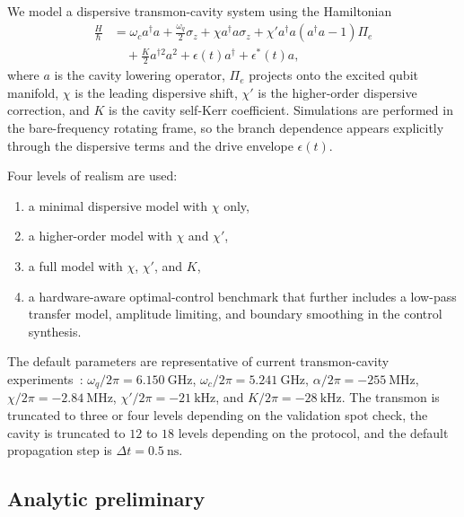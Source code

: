 \documentclass[aps,pra,twocolumn,reprint,floatfix,amsmath,amssymb]{revtex4-2}
\begin{document}
We model a dispersive transmon-cavity system using the Hamiltonian
\begin{align}
\frac{H}{\hbar} &=
\omega_c a^\dagger a + \frac{\omega_q}{2}\sigma_z
+ \chi a^\dagger a \sigma_z
+ \chi' a^\dagger a (a^\dagger a - 1) \Pi_e
\nonumber\\
&\quad
+ \frac{K}{2} a^{\dagger 2} a^2
+ \epsilon(t) a^\dagger + \epsilon^*(t) a,
\label{eq:fullham}
\end{align}
where \(a\) is the cavity lowering operator, \(\Pi_e\) projects onto the excited qubit manifold, \(\chi\) is the leading dispersive shift, \(\chi'\) is the higher-order dispersive correction, and \(K\) is the cavity self-Kerr coefficient. Simulations are performed in the bare-frequency rotating frame, so the branch dependence appears explicitly through the dispersive terms and the drive envelope \(\epsilon(t)\).

Four levels of realism are used:
\begin{enumerate}
  \item a minimal dispersive model with \(\chi\) only,
  \item a higher-order model with \(\chi\) and \(\chi'\),
  \item a full model with \(\chi\), \(\chi'\), and \(K\),
  \item a hardware-aware optimal-control benchmark that further includes a low-pass transfer model, amplitude limiting, and boundary smoothing in the control synthesis.
\end{enumerate}

The default parameters are representative of current transmon-cavity experiments~\cite{koch2007transmon,blais2021circuit}:
\(\omega_q/2\pi=\SI{6.150}{\giga\hertz}\),
\(\omega_c/2\pi=\SI{5.241}{\giga\hertz}\),
\(\alpha/2\pi=\SI{-255}{\mega\hertz}\),
\(\chi/2\pi=\SI{-2.84}{\mega\hertz}\),
\(\chi'/2\pi=\SI{-21}{\kilo\hertz}\),
and \(K/2\pi=\SI{-28}{\kilo\hertz}\).
The transmon is truncated to three or four levels depending on the validation spot check, the cavity is truncated to \(12\) to \(18\) levels depending on the protocol, and the default propagation step is \(\Delta t = \SI{0.5}{\nano\second}\).

\subsection{Analytic preliminary}
\end{document}
